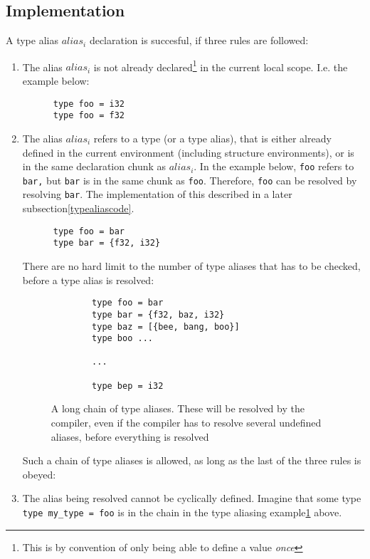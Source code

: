 \subsection{Implementation}
A type alias $alias_i$ declaration is succesful, if three rules are followed:
\begin{enumerate}
  \item The alias $alias_i$ is not already declared\footnote[]{This is by convention of
      only being able to define a value \textit{once}} in the current local
    scope. I.e. the example below:
    \begin{verbatim}
      type foo = i32
      type foo = f32
    \end{verbatim}
    
  \item The alias $alias_i$ refers to a type (or a type alias), that is either already
    defined in the current environment (including structure environments), or is
    in the same declaration chunk as $alias_i$. In the example below, \texttt{foo} refers
    to \texttt{bar,} but \texttt{bar} is in the same chunk as \texttt{foo}.
    Therefore, \texttt{foo} can be resolved by resolving \texttt{bar}. The implementation of this
    described in a later subsection\ref{typealiascode}.
    \begin{verbatim} 
      type foo = bar
      type bar = {f32, i32}
    \end{verbatim}
    There are no hard limit to the number of type aliases that has to be
    checked, before a type alias is resolved:
    \begin{figure}\label{longchain}
      \begin{verbatim} 
        type foo = bar
        type bar = {f32, baz, i32}
        type baz = [{bee, bang, boo}]
        type boo ...
  
        ...
  
        type bep = i32
        \end{verbatim}
      \caption{A long chain of type aliases. These will be resolved by the
        compiler, even if the compiler has to resolve several undefined aliases,
      before everything is resolved}
    \end{figure}
    Such a chain of type aliases is allowed, as long as the last of the three
    rules is obeyed:
  
    
  \item The alias being resolved cannot be cyclically defined.
    Imagine that some type \texttt{type my_type = foo} is in the chain in the
    type aliasing example\ref{longchain} above.\\


\end{enumerate}
